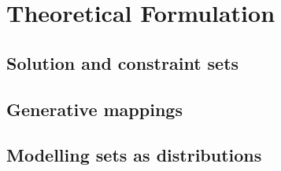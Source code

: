 \documentclass[../../main.tex]{subfiles}
\begin{document}
\chapter{Theoretical Formulation}

\section{Solution and constraint sets}

\section{Generative mappings}

\section{Modelling sets as distributions}
\end{document}
